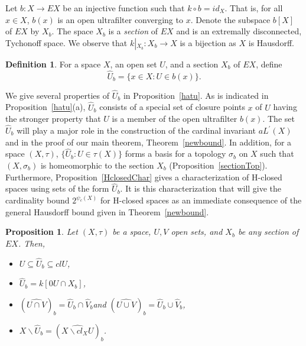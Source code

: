 \documentclass[11pt]{amsart}
\newif\ifdraft\draftfalse
\newtheorem{proposition}[theorem]{Proposition}
\theoremstyle{definition}
\newtheorem{definition}[theorem]{Definition}
\theoremstyle{remark}
\numberwithin{equation}{section}
\begin{document}
\noindent Let $b: X \rightarrow EX$ be an injective function such that $k \circ b = id_X$. That is, for all $x\in X$, $b(x)$ is an open ultrafilter converging to $x$. Denote the subspace $b[X]$ of $EX$ by $X_b$.  The space $X_b$ is a \emph{section} of $EX$ \cite{pw78} and is an extremally disconnected, Tychonoff space.  We observe that $k\left|_{X_b}\right.:X_b\to X$ is a bijection as $X$ is Hausdorff.

\begin{definition}{{\immediate{}}{\ifdraft\hspace{-\lastskip}\vadjust{\vspace{-1mm}\smash{\llap{{\tt {{hatdef}}}\hspace{8mm}}}\vspace{1mm}}\fi}}
For a space $X$, an open set $U$, and a section $X_b$ of $EX$, define 
$$\widehat{U}_b = \{x \in X: U \in b(x)\}.$$
\end{definition}
We give several properties of $\widehat{U}_b$ in Proposition~\ref{hatu}. As is indicated in Proposition~\ref{hatu}(a), $\widehat{U}_b$ consists of a special set of closure points $x$ of $U$ having the stronger property that $U$ is a member of the open ultrafilter $b(x)$. The set $\widehat{U}_b$ will play a major role in the construction of the cardinal invariant $aL^\prime(X)$ and in the proof of our main theorem, Theorem~\ref{newbound}. In addition, for a space $(X,\tau)$, $\{\widehat{U}_b: U \in \tau(X)\}$ forms a basis for a topology $\sigma_b$ on $X$ such that $(X,\sigma_b)$ is homeomorphic to the section $X_b$ (Proposition~\ref{sectionTop}). Furthermore, Proposition~\ref{HclosedChar} gives a characterization of H-closed spaces using sets of the form $\widehat{U}_b$. It is this characterization that will give the cardinality bound $2^{\psi_c(X)}$ for H-closed spaces as an immediate consequence of the general Hausdorff bound given in Theorem~\ref{newbound}.

\begin{proposition}{{\immediate{}}{\ifdraft\hspace{-\lastskip}\vadjust{\vspace{-1mm}\smash{\llap{{\tt {{hatu}}}\hspace{8mm}}}\vspace{1mm}}\fi}} 
Let $(X,\tau)$ be a space, $U,V$ open sets, and $X_b$ be any section of $EX$. Then,
\begin{itemize}
\item[(a)] $U{\subseteq}\widehat{U}_b{\subseteq} clU$,
\item[(b)] $\widehat{U}_b=k[0U \cap X_b]$,
\item[(c)] $\left(\widehat{U \cap V}\right)_b = \widehat{U}_b  \cap \widehat{V}_b$\space and $\left(\widehat{U \cup V}\right)_b = \widehat{U}_b  \cup \widehat{V}_b$\space, 
\item[(d)] $X\backslash \widehat{U} _b=(\widehat{X\backslash cl_XU})_b$\space.
\end{itemize}
\end{proposition}
\end{document}
